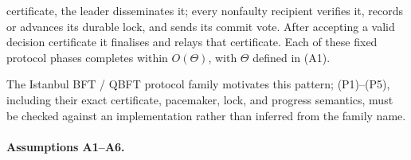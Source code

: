 \begin{definition}
\begin{enumerate}[(P1)]
        certificate, the leader disseminates it; every nonfaulty recipient
        verifies it, records or advances its durable lock, and sends its
        commit vote.
        After accepting a valid decision certificate it
        finalises and relays that certificate.  Each of these fixed protocol
        phases completes within \(O(\Theta)\), with \(\Theta\) defined in
        (A1).
\end{enumerate}
The Istanbul BFT / QBFT protocol family \cite{Moniz2020,Saltini} motivates
this pattern; (P1)--(P5), including their exact certificate, pacemaker, lock,
and progress semantics, must be checked against an implementation rather
than inferred from the family name.
\end{definition}

\paragraph{Assumptions A1--A6.}

